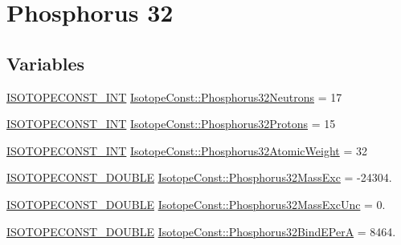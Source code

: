 \hypertarget{group___isotope_const-_phosphorus-_p32}{}\section{Phosphorus 32}
\label{group___isotope_const-_phosphorus-_p32}
\subsection*{Variables}
\begin{DoxyCompactItemize}
\item 
\mbox{\hyperlink{group___isotope_const-_macros_ga5f18360b3e99483a35c32d789e62621c}{I\+S\+O\+T\+O\+P\+E\+C\+O\+N\+S\+T\+\_\+\+I\+NT}} \mbox{\hyperlink{group___isotope_const-_phosphorus-_p32_gaea4b1470edd42d71d125eaa302342c52}{Isotope\+Const\+::\+Phosphorus32\+Neutrons}} = 17
\item 
\mbox{\hyperlink{group___isotope_const-_macros_ga5f18360b3e99483a35c32d789e62621c}{I\+S\+O\+T\+O\+P\+E\+C\+O\+N\+S\+T\+\_\+\+I\+NT}} \mbox{\hyperlink{group___isotope_const-_phosphorus-_p32_ga5f777da531958c8af57ef7df53fe6c45}{Isotope\+Const\+::\+Phosphorus32\+Protons}} = 15
\item 
\mbox{\hyperlink{group___isotope_const-_macros_ga5f18360b3e99483a35c32d789e62621c}{I\+S\+O\+T\+O\+P\+E\+C\+O\+N\+S\+T\+\_\+\+I\+NT}} \mbox{\hyperlink{group___isotope_const-_phosphorus-_p32_ga9578ac6acf4a43f05041903554015cca}{Isotope\+Const\+::\+Phosphorus32\+Atomic\+Weight}} = 32
\item 
\mbox{\hyperlink{group___isotope_const-_macros_ga8f45a7272ce02c0b4c65c44636ed719a}{I\+S\+O\+T\+O\+P\+E\+C\+O\+N\+S\+T\+\_\+\+D\+O\+U\+B\+LE}} \mbox{\hyperlink{group___isotope_const-_phosphorus-_p32_ga104ba41b939749b416ad29f7a1874abc}{Isotope\+Const\+::\+Phosphorus32\+Mass\+Exc}} = -\/24304.
\item 
\mbox{\hyperlink{group___isotope_const-_macros_ga8f45a7272ce02c0b4c65c44636ed719a}{I\+S\+O\+T\+O\+P\+E\+C\+O\+N\+S\+T\+\_\+\+D\+O\+U\+B\+LE}} \mbox{\hyperlink{group___isotope_const-_phosphorus-_p32_ga8471793abb98110c0b89d985ca7a18a3}{Isotope\+Const\+::\+Phosphorus32\+Mass\+Exc\+Unc}} = 0.
\item 
\mbox{\hyperlink{group___isotope_const-_macros_ga8f45a7272ce02c0b4c65c44636ed719a}{I\+S\+O\+T\+O\+P\+E\+C\+O\+N\+S\+T\+\_\+\+D\+O\+U\+B\+LE}} \mbox{\hyperlink{group___isotope_const-_phosphorus-_p32_gaf4448ad119a6e27c05e968ddeb24dac7}{Isotope\+Const\+::\+Phosphorus32\+Bind\+E\+PerA}} = 8464.
\item 

\end{DoxyCompactItemize}
